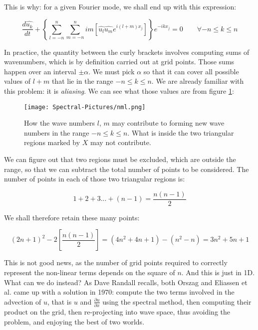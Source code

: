 This is why: for a given Fourier mode, we shall end up with this expression:

\begin{equation}
		\frac{d \widehat{u_k}}{d t}  +  \left\{ \sum_{l=-n}^{n} \sum_{m=-n}^{n}	im \left[    \widehat{u_l}  \widehat{u_m}  e^{i(l+m)x_j} \right]  \right\} e^{-ikx_j} = 0      \qquad  \forall -n \le k \le n
\end{equation}

In practice, the quantity between the curly brackets involves computing sums of wavenumbers, which is by definition carried out at grid points. Those sums happen over an interval $\pm \alpha$. We must pick $\alpha$ so that it can cover all possible values of $l+m$ that lie in the range $-n \le k \le n$. We are already familiar with this problem: it is \emph{aliasing}. We can see what those values are from figure \ref{fig:nlm}:

\begin{figure}
	\begin{center}
	\texttt{[image: Spectral-Pictures/nml.png]}
	\end{center}
	\label{fig:nlm}
	\caption{How the wave numbers $l$, $m$ may contribute to forming new wave numbers in the range  $-n \le k \le n$. What is inside the two triangular regions marked by $X$ may not contribute.}
	\end{figure}

We can figure out that two regions must be excluded, which are outside the range, so that we can subtract the total number of points to be considered. The number of points in each of those two triangular regions is:

\begin{equation}
	1+2+3 ... + (n-1) =   \frac{n(n-1)}{2} 
\end{equation}

We shall therefore retain these many points:

\begin{equation}
(2n+1)^2 - 2 \left[  \frac{n(n-1)}{2}  \right] =   (4n^2 + 4n +1) -  (n^2 - n)  = 3n^2 + 5n +1
\end{equation}

This is not good news, as the number of grid points required to correctly represent the non-linear terms depends on the square of $n$. And this is just in 1D. What can we do instead? As Dave Randall recalls, both Orszag and Eliassen et al. came up with a solution in 1970: compute the two terms involved in the advection of $u$, that is $u$ and $\frac{\partial u}{\partial x}$ using the spectral method, then computing their product on the grid, then re-projecting into wave space, thus avoiding the problem, and enjoying the best of two worlds. 

